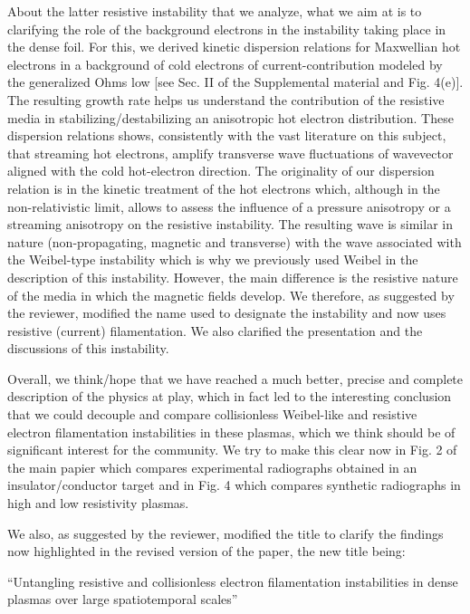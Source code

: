 \documentclass[aps,showpacs,superscriptaddress]{revtex4}%
\begin{document}
\begin{enumerate}
About the latter resistive instability that we analyze, what we aim at is to clarifying the role of the background electrons in the  instability taking place in the dense foil.
For this, 
we derived kinetic dispersion relations for Maxwellian hot electrons in a background of cold electrons of current-contribution modeled by the generalized Ohms low [see Sec. II of the Supplemental material and Fig. 4(e)]. 
The resulting growth rate helps us understand the contribution of the resistive media in stabilizing/destabilizing an anisotropic hot electron distribution. These dispersion relations shows, consistently with the vast literature on this subject,  that streaming hot electrons, amplify transverse wave fluctuations of wavevector aligned with the cold hot-electron direction. 
The originality of our dispersion relation is in the kinetic treatment of the hot electrons which, although in the non-relativistic limit, allows to assess the influence of a pressure anisotropy or a streaming anisotropy  on the resistive instability. 
The resulting wave is  similar in nature  (non-propagating, magnetic and transverse)  with the wave associated with the Weibel-type instability which is why we previously used Weibel in the description of this instability.  
However,  the main difference is the resistive nature of the media in which the magnetic fields  develop.  We therefore, as suggested by the reviewer, modified the name used to designate the instability and now uses resistive (current) filamentation. We also clarified the presentation and the discussions of this instability.

Overall, we think/hope that  we have reached a much better, precise and complete description of the physics at play, which in fact led to the interesting conclusion that we could decouple and compare collisionless Weibel-like and resistive electron filamentation instabilities in these plasmas, which we think should be of significant interest for the community.
We try to make this clear now in Fig. 2  of the main papier which compares experimental radiographs obtained in an  insulator/conductor target and in Fig. 4 which compares synthetic radiographs in high and low resistivity plasmas.

We also, as suggested by the reviewer, modified the title to clarify the findings now highlighted in the revised version of the paper, the new title being:

“Untangling resistive and collisionless electron filamentation instabilities in dense plasmas over large spatiotemporal scales”



\end{enumerate}
\end{document}
